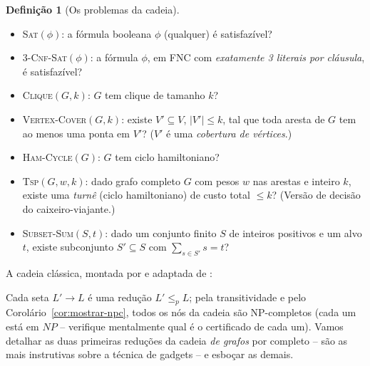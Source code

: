 \documentclass[9pt,a4paper]{extarticle}
\theoremstyle{definition}
\newtheorem{definition}{Definição}[section]
\begin{document}
\begin{definition}[Os problemas da cadeia]\label{def:problemas}
\begin{itemize}
\item \textsc{Sat}\((\phi)\): a fórmula booleana \(\phi\) (qualquer) é satisfazível?
\item \textsc{3-Cnf-Sat}\((\phi)\): a fórmula \(\phi\), em FNC com \emph{exatamente 3 literais por cláusula}, é satisfazível?
\item \textsc{Clique}\((G,k)\): \(G\) tem clique de tamanho \(k\)?
\item \textsc{Vertex-Cover}\((G,k)\): existe \(V' \subseteq V\), \(|V'| \leq k\), tal que toda aresta de \(G\) tem ao menos uma ponta em \(V'\)? (\(V'\) é uma \emph{cobertura de vértices}.)
\item \textsc{Ham-Cycle}\((G)\): \(G\) tem ciclo hamiltoniano?
\item \textsc{Tsp}\((G,w,k)\): dado grafo completo \(G\) com pesos \(w\) nas arestas e inteiro \(k\), existe uma \emph{turnê} (ciclo hamiltoniano) de custo total \(\leq k\)? (Versão de decisão do caixeiro-viajante.)
\item \textsc{Subset-Sum}\((S,t)\): dado um conjunto finito \(S\) de inteiros positivos e um alvo \(t\), existe subconjunto \(S' \subseteq S\) com \(\sum_{s \in S'} s = t\)?
\end{itemize}
\end{definition}

A cadeia clássica, montada por \citet{karp1972} e adaptada de \citet[Seção 34.5]{clrs2009}:

\begin{center}
\end{center}

Cada seta \(L' \to L\) é uma redução \(L' \leq_p L\); pela transitividade e pelo Corolário~\ref{cor:mostrar-npc}, todos os nós da cadeia são NP-completos (cada um está em \(NP\) -- verifique mentalmente qual é o certificado de cada um). Vamos detalhar as duas primeiras reduções da cadeia \emph{de grafos} por completo -- são as mais instrutivas sobre a técnica de gadgets -- e esboçar as demais.
\end{document}
